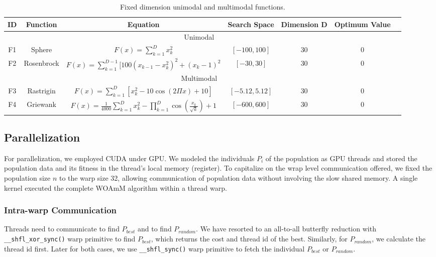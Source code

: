 \documentclass[conference]{IEEEtran}
\begin{document}
    \begin{table}[!t]\renewcommand{\arraystretch}{1}
        \caption{Fixed dimension unimodal and multimodal functions.}
        \label{tbl:func}
        \centering
        \begin{tabular}{|c|c|c|c|c|c|c|}
        \hline\bfseries ID & \bfseries Function & \bfseries Equation & \bfseries Search Space & \bfseries Dimension D & \bfseries Optimum Value\\
        \hline \multicolumn{6}{|c|}{Unimodal} \\
        \hline F1 & Sphere & \(F(x)=\sum_{k=1}^Dx_k^2\) & \([-100,100]\)&30&0\\
        \hline F2 & Rosenbrock & \(F(x)=\sum_{k=1}^{D-1}[100(x_{k-1}-x_k^2)^2+(x_k-1)^2\) & \([-30,30]\)&30&0\\
        \hline \multicolumn{6}{|c|}{Multimodal} \\
        \hline F3 & Rastrigin & \(F(x)=\sum_{k=1}^{D}[x_k^2-10\cos(2\Pi x)+10]\) & \([-5.12,5.12]\)&30&0\\
        \hline F4 & Griewank & \(F(x)=\frac{1}{4000}\sum_{k=1}^{D}x_k^2-\prod_{k=1}^D\cos(\frac{x_k}{\sqrt{k}})+1\) & \([-600,600]\)&30&0\\
        \hline
    \end{tabular}
    \end{table}

\subsection{Parallelization}

For parallelization, we employed CUDA under GPU. 
We modeled the individuals $P_i$ of the population as GPU threads and stored the population data and its fitness in the thread’s local memory (register). 
To capitalize on the wrap level communication offered, we fixed the population size $n$ to the warp size 32, allowing communication of population data without involving the slow shared memory. 
A single kernel executed the complete WOAmM algorithm within a thread warp.

\subsubsection{Intra-warp Communication}

Threads need to communicate to find $P_{best}$ and to find $P_{random}$. 
We have resorted to an all-to-all butterfly reduction with \lstinline{__shfl_xor_sync()} warp primitive to find $P_{best}$, which returns the cost and thread id of the best. 
Similarly, for $P_{random}$, we calculate the thread id first. 
Later for both cases, we use \lstinline{__shfl_sync()} warp primitive to fetch the individual $P_{best}$ or $P_{random}$.
\end{document}

